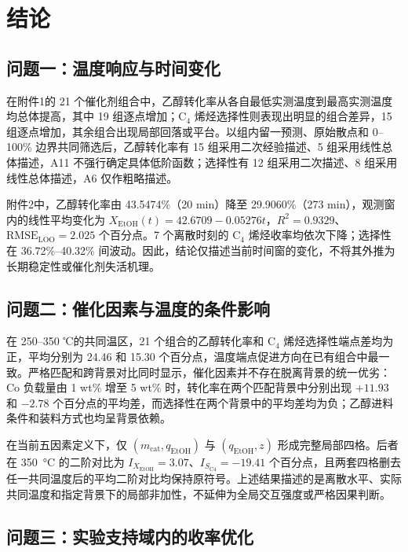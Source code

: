 \section{结论}

\subsection{问题一：温度响应与时间变化}

在附件1的 21 个催化剂组合中，乙醇转化率从各自最低实测温度到最高实测温度均总体提高，其中 19 组逐点增加；$\mathrm{C}_4$ 烯烃选择性则表现出明显的组合差异，15 组逐点增加，其余组合出现局部回落或平台。以组内留一预测、原始散点和 0--100\% 边界共同筛选后，乙醇转化率有 15 组采用二次经验描述、5 组采用线性总体描述，A11 不强行确定具体低阶函数；选择性有 12 组采用二次描述、8 组采用线性总体描述，A6 仅作粗略描述。

附件2中，乙醇转化率由 43.5474\%（20 min）降至 29.9060\%（273 min），观测窗内的线性平均变化为 $X_{\mathrm{EtOH}}(t)=42.6709-0.05276t$，$R^2=0.9329$、$\mathrm{RMSE}_{\mathrm{LOO}}=2.025$ 个百分点。7 个离散时刻的 $\mathrm{C}_4$ 烯烃收率均依次下降；选择性在 36.72\%--40.32\% 间波动。因此，结论仅描述当前时间窗的变化，不将其外推为长期稳定性或催化剂失活机理。

\subsection{问题二：催化因素与温度的条件影响}

在 250--350 ℃的共同温区，21 个组合的乙醇转化率和 $\mathrm{C}_4$ 烯烃选择性端点差均为正，平均分别为 24.46 和 15.30 个百分点，温度端点促进方向在已有组合中最一致。严格匹配和跨背景对比同时显示，催化因素并不存在脱离背景的统一优劣：Co 负载量由 1 wt\% 增至 5 wt\% 时，转化率在两个匹配背景中分别出现 $+11.93$ 和 $-2.78$ 个百分点的平均差，而选择性在两个背景中的平均差均为负；乙醇进料条件和装料方式也均呈背景依赖。

在当前五因素定义下，仅 $(m_{\mathrm{cat}},q_{\mathrm{EtOH}})$ 与 $(q_{\mathrm{EtOH}},z)$ 形成完整局部四格。后者在 \SI{350}{\degreeCelsius} 的二阶对比为 $I_{X_{\mathrm{EtOH}}}=3.07$、$I_{S_{\mathrm{C4}}}=-19.41$ 个百分点，且两套四格删去任一共同温度后的平均二阶对比均保持原符号。上述结果描述的是离散水平、实际共同温度和指定背景下的局部非加性，不延伸为全局交互强度或严格因果判断。

\subsection{问题三：实验支持域内的收率优化}

